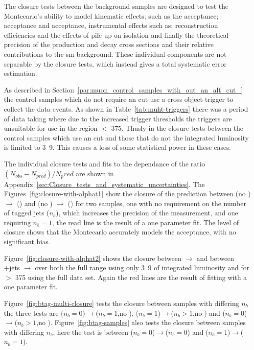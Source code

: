 The closure tests between the background samples are designed to test the 
Montecarlo's ability to model kinematic effects; such as the \alt acceptance; 
\Pmuon acceptance and \Pphoton acceptance, instrumental effects such as; 
reconstruction efficiencies and the effects of pile up on isolation and finally 
the theoretical precision of the production and decay cross sections and their 
relative contributions to the \ac{sm} background. These individual components 
are not separable by the closure tests, which instead gives a total systematic 
error estimation.

As described in Section~\ref{par:muon_control_samples_with_out_an_alt_cut_} the 
control samples which do not require an \alt cut use a \muht cross object 
trigger to collect the data events. As shown in Table~\ref{tab:muht-triggers} 
there was a period of data taking where due to the increased trigger thresholds 
the \muht triggers are unsuitable for use in the region \HT $<$ 
\unit{375}{\GeV}. Thusly in the closure tests between the control samples which 
use an \alt cut and those that do not the integrated luminosity is limited to 
\unit{3.9}{\invfb}. This causes a loss of some statistical power in these cases.

The individual closure tests and fits to the \HT dependance of the ratio 
$\left(N_{obs} - N_{pred}\right)/N_pred$ are shown in 
Appendix~\ref{sec:Closure_tests_and_systematic_uncertainties}.
The Figures~\ref{fig:closure-with-alphat1} show the closure of the prediction 
between \mj(no \alt) $\rightarrow$ \mj(\altg) and \mmj(no \alt) $\rightarrow$ 
\mmj(\altg) for two samples, one with no requirement on the number of \Pbottom 
tagged jets ($n_{b}$), which increases the precision of the measurement, and 
one requiring $n_{b} = 1$, the read line is the result of a one parameter fit. 
The level of closure shows that the Montecarlo accurately models the \alt 
acceptance, with no significant bias.

Figure~\ref{fig:closure-with-alphat2} shows the closure between \mj 
$\rightarrow$ \mmj and between \Pphoton+jets $\rightarrow$ \mmj over both the 
full \HT range using only \unit{3.9}{\invfb} of integrated luminosity and for 
\HT $>$ \unit{375}{\GeV} using the full data set. Again the red lines are the 
result of fitting with a one parameter fit.

Figure~\ref{fig:btag-multi-closure} tests the closure between samples with 
differing $n_{b}$ the three tests are \mj($n_b = 0$)$\rightarrow$\mj($n_b = 
1$,no \alt), \mj($n_b = 1$)$\rightarrow$\mj($n_b > 1$,no \alt) and \mj($n_b = 
0$)$\rightarrow$\mj($n_b > 1$,no \alt). Figure~\ref{fig:btag-samples} also 
tests the closure between samples with differing $n_{b}$, here the test is 
between \mj($n_b = 0$)$\rightarrow$\mmj($n_b = 0$) and \mj($n_b =  
1$)$\rightarrow$\mmj($n_b = 1$).

